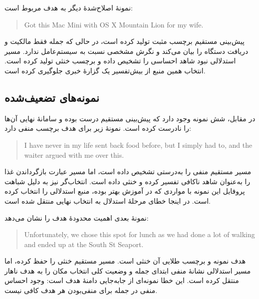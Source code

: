نمونۀ اصلاح‌شدۀ دیگر به هدف  مربوط است:

\begin{latin}
\begin{quote}
Got this Mac Mini with OS X Mountain Lion for my wife.
\end{quote}
\end{latin}

پیش‌بینی مستقیم برچسب مثبت تولید کرده است، در حالی که جمله فقط مالکیت و دریافت دستگاه را بیان می‌کند و نگرش مشخصی نسبت به سیستم‌عامل ندارد. مسیر استدلالی نبود شاهد احساسی را تشخیص داده و برچسب خنثی تولید کرده است. انتخاب همین منبع از بیش‌تفسیر یک گزارۀ خبری جلوگیری کرده است.

\subsection{نمونه‌های تضعیف‌شده}

در مقابل، شش نمونه وجود دارد که پیش‌بینی مستقیم درست بوده و سامانۀ نهایی آن‌ها را نادرست کرده است. نمونۀ زیر برای هدف  برچسب منفی دارد:

\begin{latin}
\begin{quote}
I have never in my life sent back food before, but I simply had to, and the waiter argued with me over this.
\end{quote}
\end{latin}

مسیر مستقیم منفی را به‌درستی تشخیص داده است، اما مسیر  عبارت بازگرداندن غذا را به‌عنوان شاهد ناکافی تفسیر کرده و خنثی داده است. انتخاب‌گر نیز به دلیل شباهت پروفایل این نمونه با مواردی که  در آموزش بهتر بوده، منبع استدلالی را انتخاب کرده است. در اینجا خطای مرحلۀ استدلال به انتخاب نهایی منتقل شده است.

نمونۀ بعدی اهمیت محدودۀ هدف را نشان می‌دهد:

\begin{latin}
\begin{quote}
Unfortunately, we chose this spot for lunch as we had done a lot of walking and ended up at the South St Seaport.
\end{quote}
\end{latin}

هدف نمونه  و برچسب طلایی آن خنثی است. مسیر مستقیم خنثی را حفظ کرده، اما مسیر استدلالی نشانۀ منفی ابتدای جمله و وضعیت کلی انتخاب مکان را به هدف ناهار منتقل کرده است. این خطا نمونه‌ای از جابه‌جایی دامنۀ هدف است: وجود احساس منفی در جمله برای منفی‌بودن هر هدف کافی نیست.

